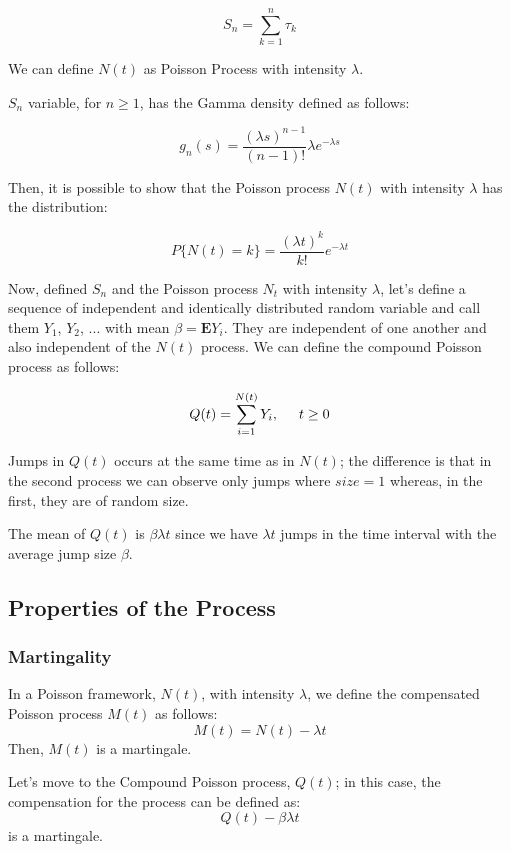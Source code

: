 \documentclass[paper=a4, fontsize=12pt]{scrartcl} %
\numberwithin{equation}{section}
\begin{document}
	\begin{equation}
		S_n = \sum_{k = 1}^{n} \tau_k
	 \end{equation}
	 
We can define $N(t)$ as Poisson Process with intensity $\lambda$.	\par
$S_n$ variable, for $n \geq 1$, has the Gamma density defined as follows:

	\begin{equation}
		g_n(s) = \frac{(\lambda s) ^{n-1}}{(n-1)!}\lambda e^{-\lambda s}
	 \end{equation}

Then, it is possible to show that the Poisson process $N(t)$ with intensity $\lambda$ has the distribution:

	\begin{equation}
		P \{ N(t) = k \} = \frac{(\lambda t)^k}{k!}e^{-\lambda t}
	 \end{equation}

Now, defined $S_n$ and the Poisson process $N_t$ with intensity $\lambda$, let's define a sequence of  independent and identically distributed random variable and call them $Y_1$, $Y_2$, $...$ with mean $\beta = \mathbf{E} Y_i$. They are independent of one another and also independent of the $N(t)$ process. We can define the compound Poisson process as follows:

	\begin{equation}
		Q(t) =  \sum_{i = 1}^{N(t)} Y_i, \hspace{0.5 cm} t \geq 0
	\end{equation}

Jumps in $Q(t)$ occurs at the same time as in $N(t)$; the difference is that in the second process we can observe only jumps where $size = 1$ whereas, in the first, they are of random size.	\par
The mean of $Q(t)$ is $\beta \lambda t$ since we have $\lambda t$ jumps in the time interval with the average jump size $\beta$.

\subsection{Properties of the Process}
	\subsubsection{Martingality}
	In a Poisson framework, $N(t)$, with intensity $\lambda$, we define the compensated Poisson process $M(t)$ as follows:
		\begin{equation}
			M(t) = N(t) - \lambda t
		\end{equation}
	Then, $M(t)$ is a martingale. \par
	Let's move to the Compound Poisson process, $Q(t)$; in this case, the compensation for the process can be defined as:
		\begin{equation}
			Q(t) - \beta \lambda t
		\end{equation}
	is a martingale.	
\end{document}
